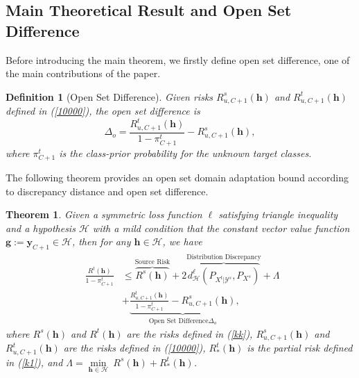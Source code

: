 \documentclass[journal]{IEEEtran}
\newtheorem{theorem}{\textbf{Theorem}}
\newtheorem{Definition}{Definition}
\begin{document}
\subsection{Main Theoretical Result and Open Set Difference}
Before introducing the main theorem, we firstly define open set difference, one of the main contributions of the paper. 
\begin{Definition}[{Open Set Difference}]\label{OSD} Given risks $R^s_{u,C+1}({\bm h})$ and $R^t_{u,C+1}({\bm h})$ defined in (\ref{10000}), the open set difference is
\begin{equation*}
    \Delta_o= \frac{R^t_{u,C+1}({\bm h})}{1-\pi_{C+1}^t}
 -R^s_{u,C+1}({\bm h}),
\end{equation*}
where $\pi_{C+1}^t$ is the  class-prior probability for the unknown target classes.
\end{Definition}
The following
theorem provides an open set domain adaptation bound according to discrepancy distance and open set difference.
\begin{theorem}\label{-1000}
Given a symmetric loss function $\ell$ satisfying triangle inequality and  a hypothesis $\mathcal{H}$ with a mild condition that the constant vector value function ${\bm g}:={\mathbf{y}}_{C+1}\in \mathcal{H}$, 
then for any ${\bm h}\in \mathcal{H}$,  we have 
\begin{equation*}
\begin{split}
 ~~\frac{R^t({\bm h})}{1-\pi_{C+1}^t}&\leq   \overbrace{R^s({\bm h})}^{\text{{Source Risk}}} +{2\overbrace{d_{\mathcal{H}}^{\ell}(P_{X^t|\mathcal{Y}^s},P_{X^s})}^{\text{{Distribution Discrepancy}}}}+\Lambda\\&+\underbrace{\frac{R^t_{u,C+1}({\bm h})}{1-\pi_{C+1}^t}
 -R^s_{u,C+1}({\bm h})}_{\text{{Open Set Difference}} \Delta_o},
 \end{split}
\end{equation*}
 where $R^s({\bm h})$ and $R^t({\bm h})$ are the risks defined in (\ref{kk}), $R^s_{u,C+1}({\bm h})$ and $R^t_{u,C+1}({\bm h})$ are the risks defined in (\ref{10000}), $R^t_{*}({\bm h})$ is the partial risk defined in (\ref{k1}), and $\Lambda=\underset{{\bm h}\in \mathcal{H}}{\min}  ~R^s({\bm h})+R^t_{*}({\bm h})$.
\end{theorem}
\end{document}
